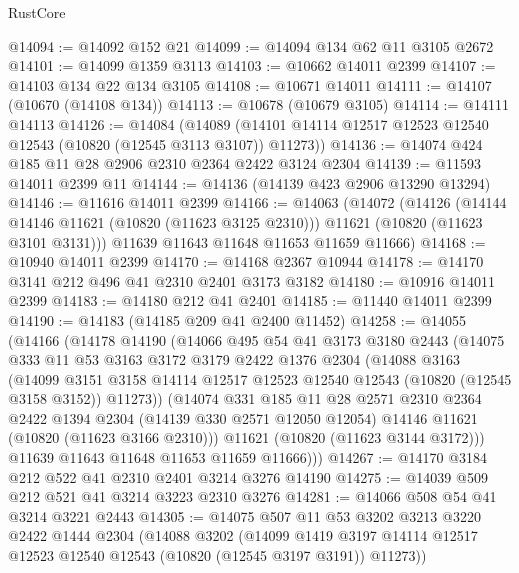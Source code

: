 \begin{lexlean}{RustCore}
\begin{coremodule}
@14094 := @14092 @152 @21
@14099 := @14094 @134 @62 @11 @3105 @2672
@14101 := @14099 @1359 @3113
@14103 := @10662 @14011 @2399
@14107 := @14103 @134 @22 @134 @3105
@14108 := @10671 @14011
@14111 := @14107 (@10670 (@14108 @134))
@14113 := @10678 (@10679 @3105)
@14114 := @14111 @14113
@14126 := @14084
    (@14089 (@14101 @14114 @12517 @12523 @12540 @12543 (@10820 (@12545 @3113 @3107)) @11273))
@14136 := @14074 @424 @185 @11 @28 @2906 @2310 @2364 @2422 @3124 @2304
@14139 := @11593 @14011 @2399 @11
@14144 := @14136 (@14139 @423 @2906 @13290 @13294)
@14146 := @11616 @14011 @2399
@14166 := @14063
    (@14072
      (@14126
        (@14144 @14146 @11621 (@10820 (@11623 @3125 @2310)))
        @11621
        (@10820 (@11623 @3101 @3131)))
      @11639
      @11643
      @11648
      @11653
      @11659
      @11666)
@14168 := @10940 @14011 @2399
@14170 := @14168 @2367 @10944
@14178 := @14170 @3141 @212 @496 @41 @2310 @2401 @3173 @3182
@14180 := @10916 @14011 @2399
@14183 := @14180 @212 @41 @2401
@14185 := @11440 @14011 @2399
@14190 := @14183 (@14185 @209 @41 @2400 @11452)
@14258 := @14055
    (@14166
      (@14178
        @14190
        (@14066
          @495
          @54
          @41
          @3173
          @3180
          @2443
          (@14075
            @333
            @11
            @53
            @3163
            @3172
            @3179
            @2422
            @1376
            @2304
            (@14088
              @3163
              (@14099
                @3151
                @3158
                @14114
                @12517
                @12523
                @12540
                @12543
                (@10820 (@12545 @3158 @3152))
                @11273))
            (@14074
              @331
              @185
              @11
              @28
              @2571
              @2310
              @2364
              @2422
              @1394
              @2304
              (@14139 @330 @2571 @12050 @12054)
              @14146
              @11621
              (@10820 (@11623 @3166 @2310)))
            @11621
            (@10820 (@11623 @3144 @3172)))
          @11639
          @11643
          @11648
          @11653
          @11659
          @11666)))
@14267 := @14170 @3184 @212 @522 @41 @2310 @2401 @3214 @3276 @14190
@14275 := @14039 @509 @212 @521 @41 @3214 @3223 @2310 @3276
@14281 := @14066 @508 @54 @41 @3214 @3221 @2443
@14305 := @14075
    @507
    @11
    @53
    @3202
    @3213
    @3220
    @2422
    @1444
    @2304
    (@14088
      @3202
      (@14099 @1419 @3197 @14114 @12517 @12523 @12540 @12543 (@10820 (@12545 @3197 @3191)) @11273))

\end{coremodule}
\end{lexlean}
